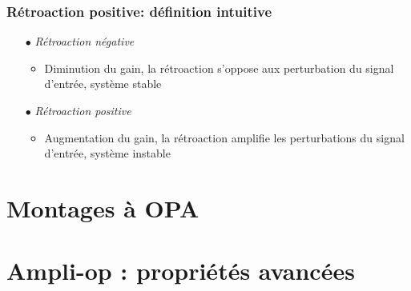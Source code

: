 		\subsubsection{Rétroaction positive: définition intuitive}
		\begin{itemize}
		\item[$\bullet$] \textit{Rétroaction négative}
			\begin{itemize}
			\item Diminution du gain, la rétroaction s'oppose aux 
			perturbation du signal d'entrée, système stable
			\end{itemize}
		\item[$\bullet$] \textit{Rétroaction positive}
			\begin{itemize}
			\item Augmentation du gain, la rétroaction amplifie les 
			perturbations du signal d'entrée, système instable
			\end{itemize}
		\end{itemize}

\section{Montages à OPA}
\section{Ampli-op : propriétés avancées}
